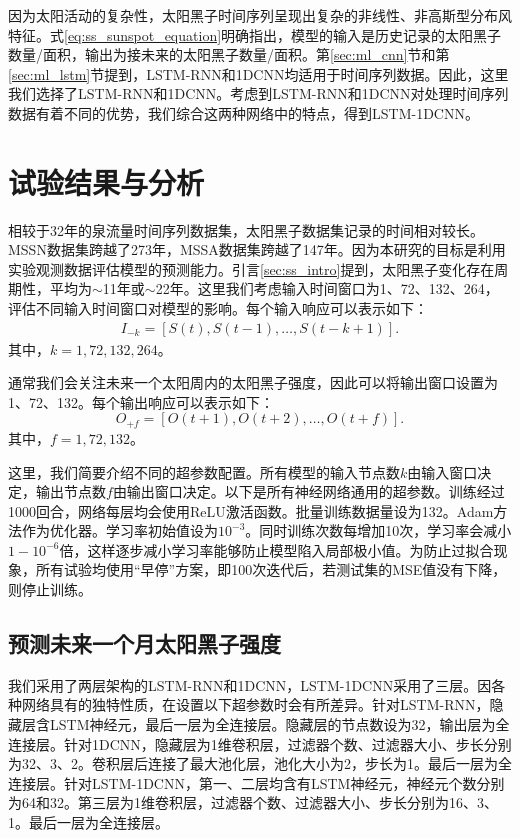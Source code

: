 因为太阳活动的复杂性，太阳黑子时间序列呈现出复杂的非线性、非高斯型分布风特征。式\ref{eq:ss_sunspot_equation}明确指出，模型的输入是历史记录的太阳黑子数量/面积，输出为接未来的太阳黑子数量/面积。第\ref{sec:ml_cnn}节和第\ref{sec:ml_lstm}节提到，LSTM-RNN和1DCNN均适用于时间序列数据。因此，这里我们选择了LSTM-RNN和1DCNN。考虑到LSTM-RNN和1DCNN对处理时间序列数据有着不同的优势，我们综合这两种网络中的特点，得到LSTM-1DCNN。

\section{试验结果与分析}\label{sec:ss_result}

相较于32年的泉流量时间序列数据集，太阳黑子数据集记录的时间相对较长。MSSN数据集跨越了273年，MSSA数据集跨越了147年。因为本研究的目标是利用实验观测数据评估模型的预测能力。引言\ref{sec:ss_intro}提到，太阳黑子变化存在周期性，平均为$\sim$11年或$\sim$22年。这里我们考虑输入时间窗口为1、72、132、264，评估不同输入时间窗口对模型的影响。每个输入响应可以表示如下：
\begin{equation}
  \label{eq:ss_input}
  \begin{split}
    I_{-k}=[S(t),S(t-1),\ldots,S(t-k+1)].
  \end{split}
\end{equation}
其中，$k=1,72,132,264$。

通常我们会关注未来一个太阳周内的太阳黑子强度，因此可以将输出窗口设置为1、72、132。每个输出响应可以表示如下：
\begin{equation}
  \label{eq:ss_output}
  O_{+f}=[O(t+1),O(t+2),\ldots,O(t+f)].
\end{equation}
其中，$f=1,72,132$。

这里，我们简要介绍不同的超参数配置。所有模型的输入节点数$k$由输入窗口决定，输出节点数$f$由输出窗口决定。以下是所有神经网络通用的超参数。训练经过1000回合，网络每层均会使用ReLU激活函数。批量训练数据量设为132。Adam方法作为优化器。学习率初始值设为$10^{-3}$。同时训练次数每增加10次，学习率会减小$1-10^{-6}$倍，这样逐步减小学习率能够防止模型陷入局部极小值。为防止过拟合现象，所有试验均使用“早停”方案，即100次迭代后，若测试集的MSE值没有下降，则停止训练。

\subsection{预测未来一个月太阳黑子强度}\label{sec:ss_result_1}

我们采用了两层架构的LSTM-RNN和1DCNN，LSTM-1DCNN采用了三层。因各种网络具有的独特性质，在设置以下超参数时会有所差异。针对LSTM-RNN，隐藏层含LSTM神经元，最后一层为全连接层。隐藏层的节点数设为32，输出层为全连接层。针对1DCNN，隐藏层为1维卷积层，过滤器个数、过滤器大小、步长分别为32、3、2。卷积层后连接了最大池化层，池化大小为2，步长为1。最后一层为全连接层。针对LSTM-1DCNN，第一、二层均含有LSTM神经元，神经元个数分别为64和32。第三层为1维卷积层，过滤器个数、过滤器大小、步长分别为16、3、1。最后一层为全连接层。 


